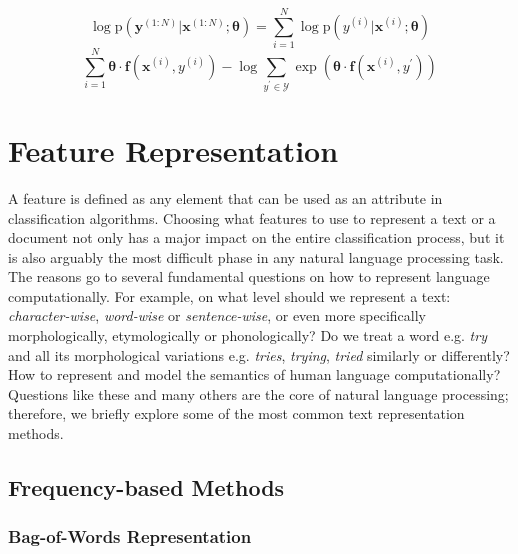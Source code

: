 \begin{equation}
\log \mathrm { p } \left( \boldsymbol { y } ^ { ( 1 : N ) } | \boldsymbol { x } ^ { ( 1 : N ) } ; \boldsymbol { \theta } \right) = \sum _ { i = 1 } ^ { N } \log \mathrm { p } \left( y ^ { ( i ) } | \boldsymbol { x } ^ { ( i ) } ; \boldsymbol { \theta } \right)
\end{equation}
\begin{equation}
\sum _ { i = 1 } ^ { N } \boldsymbol { \theta } \cdot \boldsymbol { f } \left( \boldsymbol { x } ^ { ( i ) } , y ^ { ( i ) } \right) - \log \sum _ { y ^ { \prime } \in \mathcal { Y } } \exp \left( \boldsymbol { \theta } \cdot \boldsymbol { f } \left( \boldsymbol { x } ^ { ( i ) } , y ^ { \prime } \right) \right)
\end{equation}





\section{Feature Representation}

A feature is defined as any element that can be used as an attribute in classification algorithms. Choosing what features to use to represent a text or a document not only has a major impact on the entire classification process, but it is also arguably the most difficult phase in any natural language processing task. The reasons go to several fundamental questions on how to represent language computationally. For example, on what level should we represent a text: \emph{character-wise}, \emph{word-wise} or \emph{sentence-wise}, or even more specifically morphologically, etymologically or phonologically? Do we treat a word e.g. \emph{try} and all its morphological variations e.g. \emph{tries}, \emph{trying}, \emph{tried} similarly or differently? How to represent and model the semantics of human language computationally? Questions like these and many others are the core of natural language processing; therefore, we briefly explore some of the most common text representation methods.

\subsection{Frequency-based Methods}

\subsubsection{Bag-of-Words Representation}

